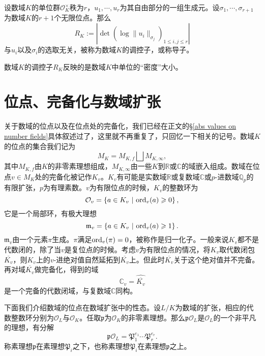 \begin{definition} \label{number field regulator}
设数域$K$的单位群$\mathcal{O}_K^{\times}$秩为$r$，$u_1, \cdots, u_r$为其自由部分的一组生成元。设$\sigma_1,\cdots,\sigma_{r+1}$为数域$K$的$r+1$个无限位点。那么
\begin{equation}
R_K := \left|\det(\log\|u_i\|_{\sigma_j})_{1\leqslant i,j \leqslant r}\right|
\end{equation}
与$u_i$以及$\sigma_i$的选取无关，被称为数域$K$的调控子，或称导子。
\end{definition}
数域$K$的调控子$R_K$反映的是数域$K$中单位的``密度''大小。

\section{位点、完备化与数域扩张}
关于数域的位点以及在位点处的完备化，我们已经在正文的\S \ref{abs values on number fields}具体叙述过了，这里就不再重复了，只回忆一下相关的记号。数域$K$的位点的集合我们记为
\begin{equation}
M_K = M_{K,f} \bigsqcup M_{K,\infty},
\end{equation}
其中$M_{K,f}$由$K$的非零素理想组成，$M_{K,\infty}$由一些$K$到$\mathbb{R}$或$\mathbb{C}$的域嵌入组成。数域在位点$v\in M_K$处的完备化被记作$K_v$。$K_v$有可能是实数域$\mathbb{R}$或复数域$\mathbb{C}$或$p$-进数域$\mathbb{Q}_p$的有限扩张，$p$为有理素数。$v$为有限位点的时候，$K_v$的整数环为
\begin{equation}
\mathcal{O}_{v} = \left\{ a\in K_v \ \middle|\ \ord_v(a) \geqslant 0 \right\},
\end{equation}
它是一个局部环，有极大理想
\begin{equation}
\mathfrak{m}_{v} = \left\{ a\in K_v \ \middle|\ \operatorname{ord}_v(a) \geqslant 1 \right\}.
\end{equation}
$\mathfrak{m}_{v}$由一个元素$\pi$生成。$\pi$满足$\operatorname{ord}_v(\pi) = 0$，被称作是归一化子。一般来说$K_v$都不是代数闭的，除了当$v$是复位点的时候。考虑$v$为有限位点的情况，将$K_v$取代数闭包$\overline{K_v}$，则$K_v$上的$v$-进绝对值自然延拓到$\overline{K_v}$上。但此时$\overline{K_v}$关于这个绝对值并不完备。再对域$\overline{K_v}$做完备化，得到的域
\begin{equation}
\mathbb{C}_v = \widehat{\overline{K_v}}
\end{equation}
是一个完备的代数闭域，与复数域$\mathbb{C}$同构。

下面我们介绍数域的位点在数域扩张中的性态。设$L/K$为数域的扩张，相应的代数整数环分别为$\mathcal{O}_L$与$\mathcal{O}_K$。任取$\mathfrak{p}$为$\mathcal{O}_K$的非零素理想。那么$\mathfrak{p}\mathcal{O}_L$是$\mathcal{O}_L$的一个非平凡的理想，有分解
\begin{equation} \label{prime ideals decomposition}
\mathfrak{p}\mathcal{O}_L = \mathfrak{P}_1^{e_1}\cdots \mathfrak{P}_r^{e_r}.
\end{equation}
称素理想$\mathfrak{p}$在素理想$\mathfrak{P}_i$之下，也称素理想$\mathfrak{P}_i$在素理想$\mathfrak{p}$之上。

